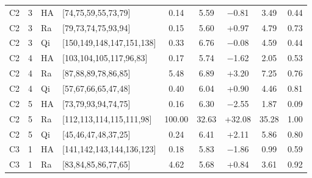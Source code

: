 \begin{tabular}[t]{@{}lclp{2.75cm}ccccc@{}}
C2 & 3 & HA & [74,75,59,55,73,79] & 0.14 & 5.59 & $-$0.81 & 3.49 & 0.44 \\
C2 & 3 & Ra & [79,73,74,75,93,94] & 0.15 & 5.60 & +0.97 & 4.79 & 0.73 \\
C2 & 3 & Qi & [150,149,148,147,151,138] & 0.33 & 6.76 & $-$0.08 & 4.59 & 0.44 \\
C2 & 4 & HA & [103,104,105,117,96,83] & 0.17 & 5.74 & $-$1.62 & 2.05 & 0.53 \\
C2 & 4 & Ra & [87,88,89,78,86,85] & 5.48 & 6.89 & +3.20 & 7.25 & 0.76 \\
C2 & 4 & Qi & [57,67,66,65,47,48] & 0.40 & 6.04 & +0.90 & 4.46 & 0.81 \\
C2 & 5 & HA & [73,79,93,94,74,75] & 0.16 & 6.30 & $-$2.55 & 1.87 & 0.09 \\
C2 & 5 & Ra & [112,113,114,115,111,98] & 100.00 & 32.63 & +32.08 & 35.28 & 1.00 \\
C2 & 5 & Qi & [45,46,47,48,37,25] & 0.24 & 6.41 & +2.11 & 5.86 & 0.80 \\
C3 & 1 & HA & [141,142,143,144,136,123] & 0.18 & 5.83 & $-$1.86 & 0.99 & 0.59 \\
C3 & 1 & Ra & [83,84,85,86,77,65] & 4.62 & 5.68 & +0.84 & 3.61 & 0.92 \\
\bottomrule
\end{tabular}\hfill
